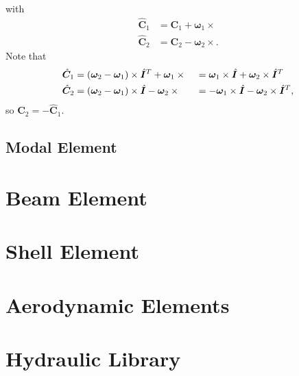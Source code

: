 \documentclass[10pt,dvips,fleqn,subeqn]{report}
\newcommand{\T}[1]{\bm{#1}}
\newcommand{\TT}[1]{\bm{#1}}
\begin{document}
with
\begin{subequations}
\begin{align}
	\hat{\TT{C}}_1 &= \TT{C}_1 + \T{\omega}_1\times{}
	\\
	\hat{\TT{C}}_2 &= \TT{C}_2 - \T{\omega}_2\times{}
	.
\end{align}
\end{subequations}
Note that
\begin{subequations}
\begin{align}
	\hat{\TT{C}}_1
	&= \plbr{\T{\omega}_2 - \T{\omega}_1}\times\hat{\TT{I}}^T
	+ \T{\omega}_1\times{}
	&&= \T{\omega}_1 \times\hat{\TT{I}}
		+ \T{\omega}_2 \times\hat{\TT{I}}^T
	\\
	\hat{\TT{C}}_2
	&= \plbr{\T{\omega}_2 - \T{\omega}_1}\times\hat{\TT{I}}
	- \T{\omega}_2\times{}
	&&= - \T{\omega}_1 \times\hat{\TT{I}}
		- \T{\omega}_2 \times\hat{\TT{I}}^T
	,
\end{align}
\end{subequations}
so $\hat{\TT{C}}_2 = - \hat{\TT{C}}_1$.












\section{Modal Element}




\chapter{Beam Element}




\chapter{Shell Element}




\chapter{Aerodynamic Elements}





\chapter{Hydraulic Library}

\end{document}
